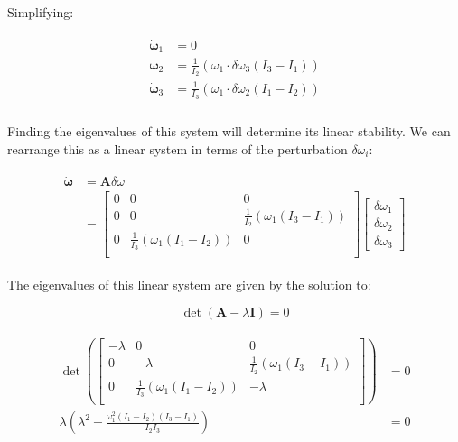 \documentclass[
]{article}
\begin{document}
Simplifying:

\[\begin{aligned}
\begin{aligned}
    \dot{\boldsymbol{\omega}}_1 &= 0 \\
    \dot{\boldsymbol{\omega}}_2 &= \frac{1}{I_2} \left(\omega_1 \cdot \delta\omega_3 \left(I_3 - I_1\right) \right)\\
    \dot{\boldsymbol{\omega}}_3 &= \frac{1}{I_3} \left(\omega_1 \cdot \delta\omega_2 \left(I_1 - I_2\right) \right)\\
\end{aligned}
\end{aligned}\]

Finding the eigenvalues of this system will determine its linear
stability. We can rearrange this as a linear system in terms of the
perturbation \(\delta \omega_i\):

\[\begin{aligned}
\begin{aligned}
    \dot{\boldsymbol{\omega}} &= \boldsymbol{A} \delta \omega \\
    &= \begin{bmatrix}
        0 & 0 & 0 \\
        0 & 0 & \frac{1}{I_2} \left(\omega_1 \left(I_3 - I_1\right) \right)\\
        0 & \frac{1}{I_3} \left(\omega_1 \left(I_1 - I_2\right) \right) & 0 \\
    \end{bmatrix}
    \begin{bmatrix} \delta\omega_1 \\ \delta\omega_2 \\ \delta\omega_3 \end{bmatrix}
\end{aligned}
\end{aligned}\]

The eigenvalues of this linear system are given by the solution to:

\[\det\left(\boldsymbol{A} - \lambda \boldsymbol{I}\right) = 0\]

\[\begin{aligned}
\begin{aligned}
    \det\left(\begin{bmatrix}
        -\lambda & 0 & 0 \\
        0 & -\lambda & \frac{1}{I_2} \left(\omega_1 \left(I_3 - I_1\right) \right)\\
        0 & \frac{1}{I_3} \left(\omega_1 \left(I_1 - I_2\right) \right) & -\lambda \\
    \end{bmatrix}\right) &= 0 \\
    \lambda \left( \lambda^2 - \frac{\omega_1^2 \left(I_1 - I_2\right) \left(I_3 - I_1\right)}{I_2 I_3} \right) &= 0 \\
\end{aligned}
\end{aligned}\]
\end{document}
